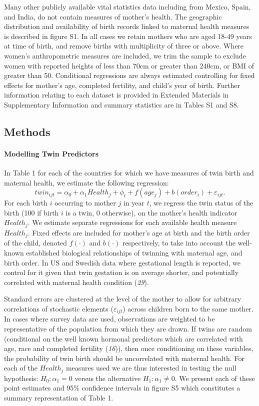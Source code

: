 \documentclass[11pt]{article}
\begin{document}
Many other publicly available vital statistics data including from Mexico, Spain, and India, do not contain  measures of mother's health.  The geographic distribution and availability of birth records linked to maternal health measures is described in figure S1. In all cases we retain mothers who are aged 18-49 years at time of birth, and remove births with multiplicity of three or above.  Where women's anthropometric measures are included, we trim the sample to exclude women with reported heights of less than 70cm or greater than 240cm, or BMI of greater than 50.  Conditional regressions are always estimated controlling for fixed effects for mother's age, completed fertility, and child's year of birth. Further information relating to each dataset is provided in Extended Materials in Supplementary Information and summary statistics are in Tables S1 and S8.  

\subsection*{Methods}

\paragraph{Modelling Twin Predictors}
In Table 1 for each of the countries for which we have measures of twin birth and maternal health, we estimate the following regression:
\begin{equation}
  twin_{ijt}=\alpha_0 + \alpha_1 Health_j + \phi_t + f(age_j) + b(order_i) + \varepsilon_{ijt}.
\end{equation}
For each birth $i$ occurring to mother $j$ in year $t$, we regress the twin status of the birth (100 if birth $i$ is a twin, 0 otherwise), on the mother's health indicator $Health_j$. We estimate separate regressions for each available health measure $Health_j$. Fixed effects are included for mother's age at birth and the birth order of the child, denoted $f(\cdot)$ and $b(\cdot)$ respectively, to take into account the well-known established biological relationships of twinning with maternal age, and birth order. In US and Swedish data where gestational length is reported, we control for it given that twin gestation is on average shorter, and potentially correlated with maternal health condition (\emph{29}).

Standard errors are clustered at the level of the mother to allow for arbitrary correlations of stochastic elements ($\varepsilon_{ijt}$) across children born to the same mother. In cases where survey data are used, observations are weighted to be representative of the population from which they are drawn. If twins are random (conditional on the well known  hormonal predictors which are correlated with age, race and completed fertility (\emph{16})), then once conditioning on these variables, the probability of twin birth should be uncorrelated with maternal health. For each of the $Health_j$ measures used we are thus interested in testing the null hypothesis: $H_0: \alpha_1=0$ versus the alternative $H_1: \alpha_1\neq0$.  We present each of these point estimates and 95\% confidence intervals in figure S5 which constitutes a summary representation of Table 1. 
\end{document}
